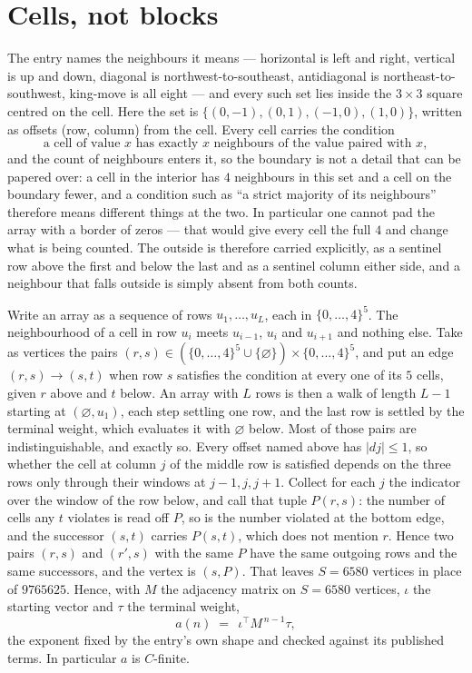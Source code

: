 \documentclass[11pt,a4paper]{article}
\theoremstyle{plain}
\theoremstyle{definition}
\begin{document}
\section{Cells, not blocks}

The entry names the neighbours it means --- horizontal is left and right, vertical is up and
down, diagonal is northwest-to-southeast, antidiagonal is northeast-to-southwest, king-move is
all eight --- and every such set lies inside the $3\times3$ square centred on the cell. Here
the set is $\{(0,-1), (0,1), (-1,0), (1,0)\}$, written as offsets (row, column) from the cell. Every cell carries
the condition
\[
\text{a cell of value }x\text{ has exactly }x\text{ neighbours of the value paired with }x,
\]
and the count of neighbours enters it, so the boundary is not a detail that can be papered
over: a cell in the interior has $4$ neighbours in this set and a cell on the boundary
fewer, and a condition such as ``a strict majority of its neighbours'' therefore means
different things at the two. In particular one cannot pad the array with a border of zeros ---
that would give every cell the full $4$ and change what is being counted. The outside is
therefore carried
explicitly, as a sentinel row above the first and below the last and as a sentinel column
either side, and a neighbour that falls outside is simply absent from both counts.

Write an array as a sequence of rows $u_1,\dots,u_L$, each in
$\{0,\dots,4\}^{5}$. The neighbourhood of a cell in row $u_i$ meets $u_{i-1}$,
$u_i$ and $u_{i+1}$ and nothing else. Take as vertices the pairs
$(r,s)\in(\{0,\dots,4\}^{5}\cup\{\varnothing\})\times\{0,\dots,4\}^{5}$,
and put an edge $(r,s)\to(s,t)$ when row $s$ satisfies the condition at every one of its
$5$ cells, given $r$ above and $t$ below. An array with $L$ rows is then a walk of length
$L-1$ starting at $(\varnothing,u_1)$, each step settling one row, and the last row is
settled by the terminal weight, which evaluates it with $\varnothing$ below. Most of those pairs are indistinguishable, and exactly so. Every offset named above has $|dj|\le 1$, so whether the cell at column $j$ of the middle row is satisfied depends on the three rows only through their windows at $j-1,j,j+1$. Collect for each $j$ the indicator over the window of the row below, and call that tuple $P(r,s)$: the number of cells any $t$ violates is read off $P$, so is the number violated at the bottom edge, and the successor $(s,t)$ carries $P(s,t)$, which does not mention $r$. Hence two pairs $(r,s)$ and $(r',s)$ with the same $P$ have the same outgoing rows and the same successors, and the vertex is $(s,P)$. That leaves $S=6580$ vertices in place of $9765625$. Hence,
with $M$ the adjacency matrix on $S=6580$ vertices, $\iota$ the starting vector and $\tau$ the
terminal weight,
\[
a(n)\;=\;\,\iota^{\!\top}M^{\,n-1}\tau ,
\]
the exponent fixed by the entry's own shape and checked against its published terms. In
particular $a$ is $C$-finite.
\end{document}
